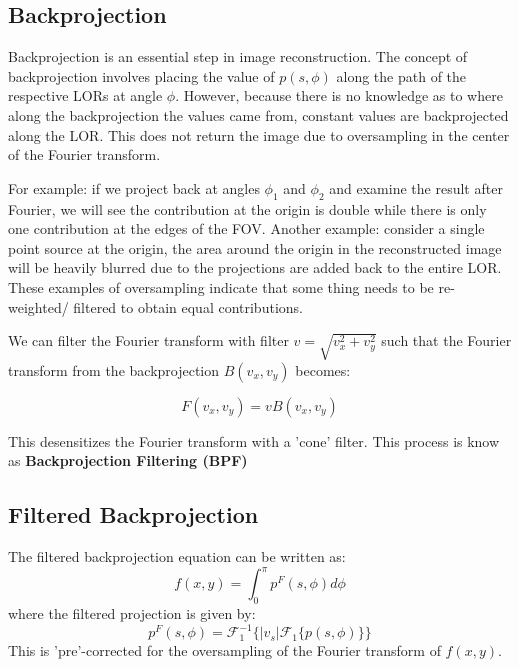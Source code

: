 \documentclass{article}
\begin{document}
\subsection{Backprojection}
Backprojection is an essential step in image reconstruction. The concept of backprojection involves placing the value of $p(s,\phi)$ along the path of the respective LORs at angle $\phi$. However, because there is no knowledge as to where along the backprojection the values came from, constant values are backprojected along the LOR. This does not return the image due to oversampling in the center of the Fourier transform. 

For example: if we project back at angles $\phi_1$ and $\phi_2$ and examine the result after Fourier, we will see the contribution at the origin is double while there is only one contribution at the edges of the FOV. 
Another example: consider a single point source at the origin, the area around the origin in the reconstructed image will be heavily blurred due to the projections are added back to the entire LOR. These examples of oversampling indicate that some thing needs to be re-weighted/ filtered to obtain equal contributions. 

We can filter the Fourier transform with filter $v = \sqrt{v_x^2 + v_y^2}$ such that the Fourier transform from the backprojection $B(v_x,v_y)$ becomes:

\begin{equation} \label{eq.filtered fourier}
    F(v_x,v_y)= v B(v_x,v_y)
\end{equation}



This desensitizes the Fourier transform with a 'cone' filter. This process is know as \textbf{Backprojection Filtering (BPF)}

\subsection{Filtered Backprojection}
The filtered backprojection equation can be written as:
 \begin{equation} \label{eq.filtered backprojection}
  f(x,y) = \int_0^\pi p^F(s,\phi) d\phi
 \end{equation}
where the filtered projection is given by:
\begin{equation}
	p^F(s,\phi) = \mathcal{F}_1^{-1} \bigg\{ |v_s| \mathcal{F}_1\{ p(s,\phi)\}\bigg\}
\end{equation}
This is 'pre'-corrected for the oversampling of the Fourier transform of $f(x,y)$. 
\end{document}
